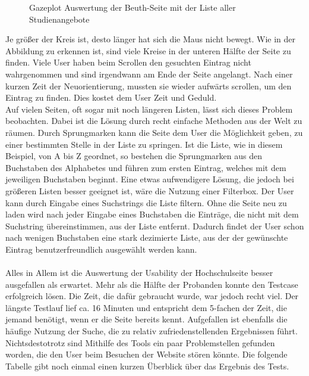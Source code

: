 \begin{center}
\end{center}
\begin{figure}[htb]
   \centering
   \caption{Gazeplot Auswertung der Beuth-Seite mit der Liste aller Studienangebote}
    \label{gazeplotCourses}
\end{figure}

Je größer der Kreis ist, desto länger hat sich die Maus nicht bewegt. Wie in der Abbildung zu erkennen ist, sind viele Kreise in der unteren Hälfte der Seite zu finden. Viele User haben beim Scrollen den gesuchten Eintrag nicht wahrgenommen und sind irgendwann am Ende der Seite angelangt. Nach einer kurzen Zeit der Neuorientierung, mussten sie wieder aufwärts scrollen, um den Eintrag zu finden. Dies kostet dem User Zeit und Geduld.\\
Auf vielen Seiten, oft sogar mit noch längeren Listen, lässt sich dieses Problem beobachten. Dabei ist die Lösung durch recht einfache Methoden aus der Welt zu räumen. Durch Sprungmarken kann die Seite dem User die Möglichkeit geben, zu einer bestimmten Stelle in der Liste zu \glqq springen\grqq{}. Ist die Liste, wie in diesem Beispiel, von A bis Z geordnet, so bestehen die Sprungmarken aus den Buchstaben des Alphabetes und führen zum ersten Eintrag, welches mit dem jeweiligen Buchstaben beginnt. Eine etwas aufwendigere Lösung, die jedoch bei größeren Listen besser geeignet ist, wäre die Nutzung einer Filterbox. Der User kann durch Eingabe eines Suchstrings die Liste filtern. Ohne die Seite neu zu laden wird nach jeder Eingabe eines Buchstaben die Einträge, die nicht mit dem Suchstring übereinstimmen, aus der Liste entfernt. Dadurch findet der User schon nach wenigen Buchstaben eine stark dezimierte Liste, aus der der gewünschte Eintrag benutzerfreundlich ausgewählt werden kann.\\
\\
Alles in Allem ist die Auswertung der Usability der Hochschulseite besser ausgefallen als erwartet. Mehr als die Hälfte der Probanden konnte den Testcase erfolgreich lösen. Die Zeit, die dafür gebraucht wurde, war jedoch recht viel. Der längste Testlauf lief ca. 16 Minuten und entspricht dem 5-fachen der Zeit, die jemand benötigt, wenn er die Seite bereits kennt. Aufgefallen ist ebenfalls die häufige Nutzung der Suche, die zu relativ zufriedenstellenden Ergebnissen führt. Nichtsdestotrotz sind Mithilfe des Tools ein paar Problemstellen gefunden worden, die den User beim Besuchen der Website stören könnte. Die folgende Tabelle gibt noch einmal einen kurzen Überblick über das Ergebnis des Tests.\\
